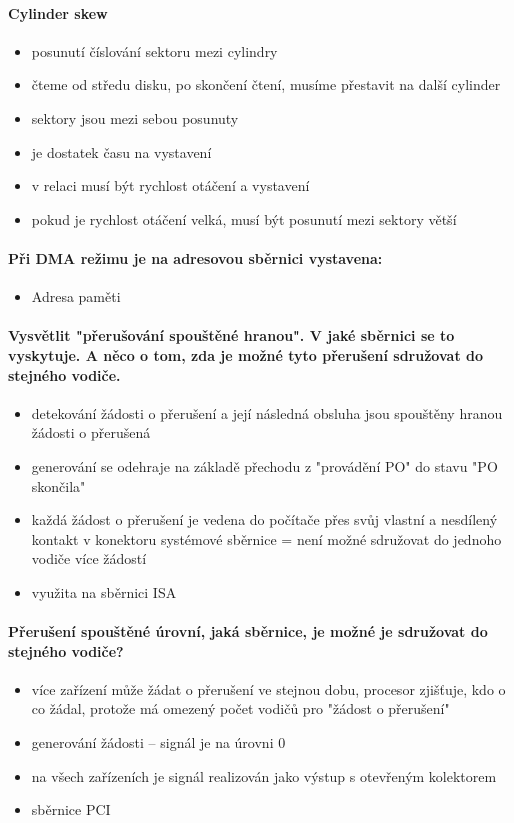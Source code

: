 \documentclass[a5paper,10pt]{article}
\begin{document}
\paragraph{Cylinder skew}
\begin{itemize}
	\item posunutí číslování sektoru mezi cylindry
	\item čteme od středu disku, po skončení čtení, musíme přestavit na další cylinder
	\item sektory jsou mezi sebou posunuty
	\item je dostatek času na vystavení
	\item v relaci musí být rychlost otáčení a vystavení
	\item pokud je rychlost otáčení velká, musí být posunutí mezi sektory větší
\end{itemize}

\paragraph{Při DMA režimu je na adresovou sběrnici vystavena:}
\begin{itemize}
	\item Adresa paměti	
\end{itemize}
 
 
\paragraph{Vysvětlit "přerušování spouštěné hranou". V jaké sběrnici se to vyskytuje. A něco o tom, zda je možné tyto přerušení sdružovat do stejného vodiče.}
\begin{itemize}
	\item detekování žádosti o přerušení a její následná obsluha jsou spouštěny hranou žádosti o přerušená
	\item generování se odehraje na základě přechodu z "provádění PO" do stavu "PO skončila"
	\item každá žádost o přerušení je vedena do počítače přes svůj vlastní a nesdílený kontakt v konektoru systémové sběrnice = není možné sdružovat do jednoho vodiče více žádostí
	\item využita na sběrnici ISA		
\end{itemize}

\paragraph{Přerušení spouštěné úrovní, jaká sběrnice, je možné je sdružovat do stejného vodiče?}
\begin{itemize}
	\item více zařízení může žádat o přerušení ve stejnou dobu, procesor zjišťuje, kdo o co žádal, protože má omezený počet vodičů pro "žádost o přerušení"
	\item generování žádosti -- signál je na úrovni 0
	\item na všech zařízeních je signál realizován jako výstup s otevřeným kolektorem
	\item sběrnice PCI	
\end{itemize}
\end{document}
